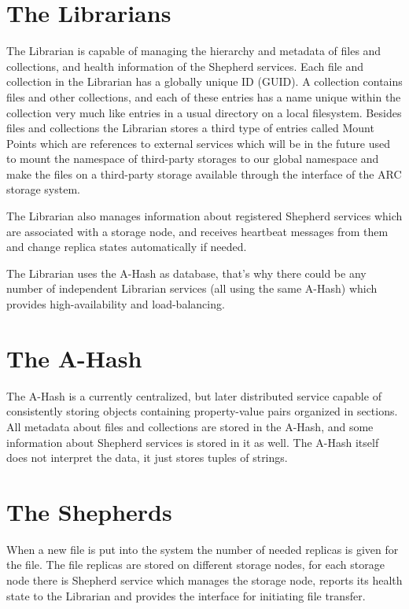 \documentclass{book}
\begin{document}
\section{The Librarians} %
\label{sec:the_librarians}
The Librarian is capable of managing the hierarchy and metadata of files and collections, and health information of the Shepherd services. Each file and collection in the Librarian has a globally unique ID (GUID). A collection contains files and other collections, and each of these entries has a name unique within the collection very much like entries in a usual directory on a local filesystem. Besides files and collections the Librarian stores a third type of entries called Mount Points which are references to external services which will be in the future used to mount the namespace of third-party storages to our global namespace and make the files on a third-party storage available through the interface of the ARC storage system.

The Librarian also manages information about registered Shepherd services which are associated with a storage node, and receives heartbeat messages from them and change replica states automatically if needed.

The Librarian uses the A-Hash as database, that’s why there could be any number of independent Librarian services (all using the same A-Hash) which provides high-availability and load-balancing.


\section{The A-Hash} %
\label{sec:the_a_hash}
The A-Hash is a currently centralized, but later distributed service capable of consistently storing objects containing property-value pairs organized in sections. All metadata about files and collections are stored in the A-Hash, and some information about Shepherd services is stored in it as well. The A-Hash itself does not interpret the data, it just stores tuples of strings.


\section{The Shepherds} %
\label{sec:the_shepherds}
When a new file is put into the system the number of needed replicas is given for the file. The file replicas are stored on different storage nodes, for each storage node there is Shepherd service which manages the storage node, reports its health state to the Librarian and provides the interface for initiating file transfer.
\end{document}
